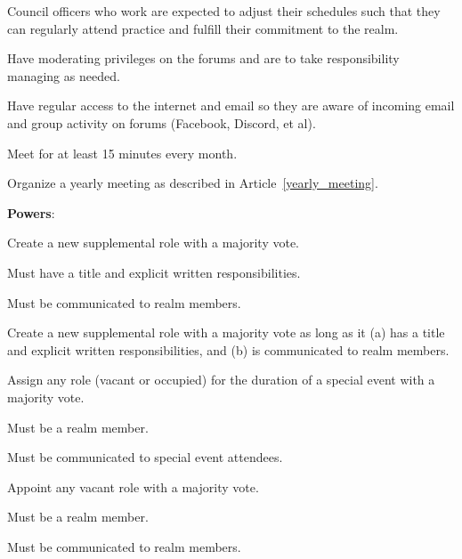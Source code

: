 \documentclass[12pt]{article}
\begin{document}
\begin{level}
\begin{level}
\begin{level}
\begin{level}
                    \item Council officers who work are expected to adjust their schedules such that they can regularly attend practice and fulfill their commitment to the realm.
                \end{level}   
                \item Have moderating privileges on the forums and are to take responsibility managing as needed.
                \item Have regular access to the internet and email so they are aware of incoming email and group activity on forums (Facebook, Discord, et al).
                \item Meet for at least 15 minutes every month.
                \item Organize a yearly meeting as described in Article~\ref{yearly_meeting}.
            \end{level}
            \item \textbf{Powers}:
            \begin{level}
                \item Create a new supplemental role with a majority vote.
                \begin{level}
                    \item Must have a title and explicit written responsibilities.
                    \item Must be communicated to realm members.
                \end{level}
                \item Create a new supplemental role with a majority vote as long as it (a) has a title and explicit written responsibilities, and (b) is communicated to realm members.
                \item Assign any role (vacant or occupied) for the duration of a special event with a majority vote.
                \begin{level}
                    \item Must be a realm member.
                    \item Must be communicated to special event attendees.
                \end{level}
                \item Appoint any vacant role with a majority vote.
                \begin{level}
                    \item Must be a realm member.
                    \item Must be communicated to realm members.

\end{level}
\end{level}
\end{level}
\end{level}
\end{document}
